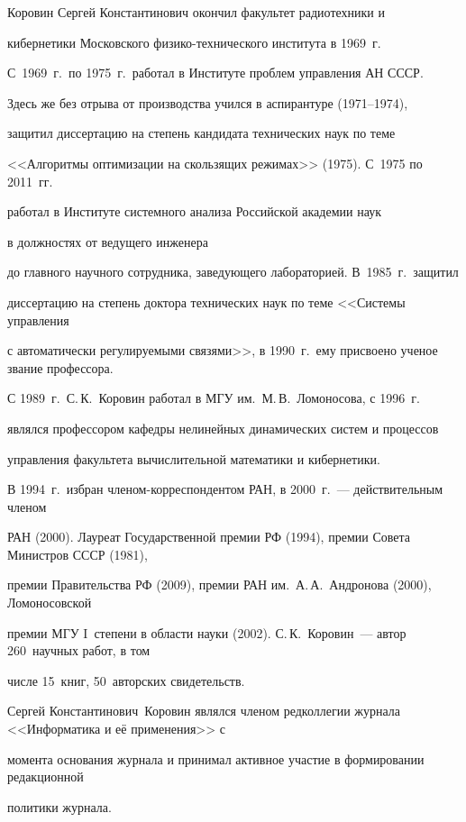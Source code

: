 Коровин Сергей Константинович окончил факультет радиотехники и 

кибернетики Московского физико-технического института в 1969~г. 

С~1969~г.\ по 1975~г.\ работал в Институте проблем управления АН СССР. 

Здесь же без отрыва от производства учился в аспирантуре (1971--1974), 

защитил диссертацию на степень кандидата технических наук по теме 

<<Алгоритмы оптимизации на скользящих режимах>> (1975). С~1975 по 2011~гг.\ 

работал в Институте системного анализа Российской академии наук 

в должностях от ведущего инженера 

до главного научного сотрудника, заведующего лабораторией. В~1985~г.\ защитил 

диссертацию на степень доктора технических наук по теме <<Системы управления 

с автоматически регулируемыми связями>>, в 1990~г.\ ему присвоено ученое звание профессора.



С 1989~г.\ С.\,К.~Коровин работал в МГУ им.\ М.\,В.~Ломоносова, с 1996~г.\ 

являлся профессором кафедры нелинейных динамических систем и процессов 

управ\-ле\-ния факультета вычислительной математики и кибернетики. 



В 1994~г.\ избран членом-кор\-рес\-пон\-ден\-том РАН, в 2000~г.~--- действительным членом 

РАН (2000). Лауреат Государственной премии РФ (1994), премии Совета Министров СССР (1981), 

премии Правительства РФ (2009), премии РАН им.\ А.\,А.~Андронова (2000), Ломоносовской 

премии МГУ I~степени в области науки (2002). С.\,К.~Коровин~--- автор 260~научных работ, в том 

чис\-ле 15~книг, 50~авторских свидетельств. 



Сергей Константинович~Коровин являлся членом редколлегии журнала <<Информатика и её применения>> с 

момента основания журнала и принимал активное участие в формировании редакционной 

политики журнала. 

